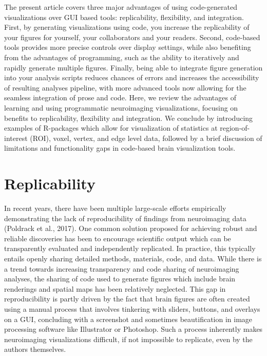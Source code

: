\documentclass{article}
\begin{document}
The present article covers three major advantages of using code-generated visualizations over GUI based tools: replicability, flexibility, and integration. First, by generating visualizations using code, you increase the replicability of your figures for yourself, your collaborators and your readers. Second, code-based tools provides more precise controls over display settings, while also benefiting from the advantages of programming, such as the ability to iteratively and rapidly generate multiple figures. Finally, being able to integrate figure generation into your analysis scripts reduces chances of errors and increases the accessibility of resulting analyses pipeline, with more advanced tools now allowing for the seamless integration of prose and code. Here, we review the advantages of learning and using programmatic neuroimaging visualizations, focusing on benefits to replicability, flexibility and integration. We conclude by introducing examples of R-packages which allow for visualization of statistics at region-of-interest (ROI), voxel, vertex, and edge level data, followed by a brief discussion of limitations and functionality gaps in code-based brain visualization tools.

\hypertarget{replicability}{%
\section{Replicability}\label{replicability}}

In recent years, there have been multiple large-scale efforts empirically demonstrating the lack of reproducibility of findings from neuroimaging data (Poldrack et al., 2017). One common solution proposed for achieving robust and reliable discoveries has been to encourage scientific output which can be transparently evaluated and independently replicated. In practice, this typically entails openly sharing detailed methods, materials, code, and data. While there is a trend towards increasing transparency and code sharing of neuroimaging analyses, the sharing of code used to generate figures which include brain renderings and spatial maps has been relatively neglected. This gap in reproducibility is partly driven by the fact that brain figures are often created using a manual process that involves tinkering with sliders, buttons, and overlays on a GUI, concluding with a screenshot and sometimes beautification in image processing software like Illustrator or Photoshop. Such a process inherently makes neuroimaging visualizations difficult, if not impossible to replicate, even by the authors themselves.
\end{document}
